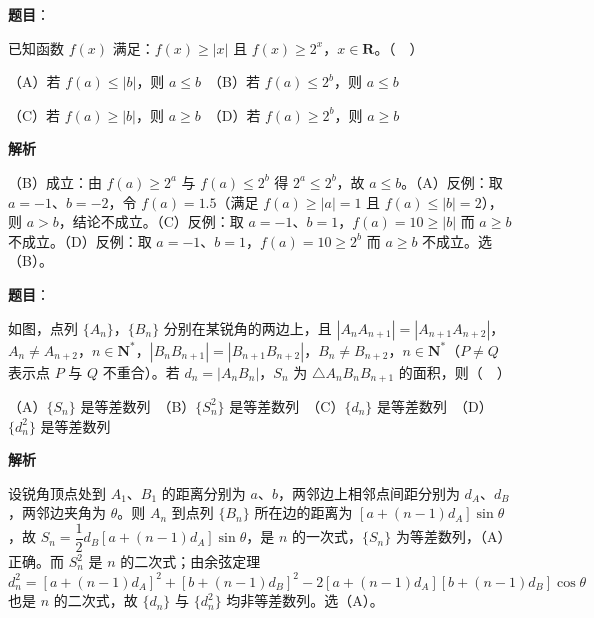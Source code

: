\begin{answer}

\textbf{题目}：

已知函数 \(f(x)\) 满足：\(f(x)\geqslant|x|\) 且 \(f(x)\geqslant2^{x}\)，\(x\in\mathbf{R}\)。（　）

（A）若 \(f(a)\leqslant|b|\)，则 \(a\leqslant b\)　（B）若 \(f(a)\leqslant2^{b}\)，则 \(a\leqslant b\)

（C）若 \(f(a)\geqslant|b|\)，则 \(a\geqslant b\)　（D）若 \(f(a)\geqslant2^{b}\)，则 \(a\geqslant b\)

\textbf{解析}

（B）成立：由 \(f(a)\geqslant2^{a}\) 与 \(f(a)\leqslant2^{b}\) 得 \(2^{a}\leqslant2^{b}\)，故 \(a\leqslant b\)。（A）反例：取 \(a=-1\)、\(b=-2\)，令 \(f(a)=1.5\)（满足 \(f(a)\geqslant|a|=1\) 且 \(f(a)\leqslant|b|=2\)），则 \(a>b\)，结论不成立。（C）反例：取 \(a=-1\)、\(b=1\)，\(f(a)=10\geqslant|b|\) 而 \(a\geqslant b\) 不成立。（D）反例：取 \(a=-1\)、\(b=1\)，\(f(a)=10\geqslant2^{b}\) 而 \(a\geqslant b\) 不成立。选（B）。


\end{answer}
\begin{answer}

\textbf{题目}：

如图，点列 \(\{A_{n}\}\)，\(\{B_{n}\}\) 分别在某锐角的两边上，且 \(|A_{n}A_{n+1}|=|A_{n+1}A_{n+2}|\)，\(A_{n}\neq A_{n+2}\)，\(n\in\mathbf{N}^{*}\)，\(|B_{n}B_{n+1}|=|B_{n+1}B_{n+2}|\)，\(B_{n}\neq B_{n+2}\)，\(n\in\mathbf{N}^{*}\)（\(P\neq Q\) 表示点 \(P\) 与 \(Q\) 不重合）。若 \(d_{n}=|A_{n}B_{n}|\)，\(S_{n}\) 为 \(\triangle A_{n}B_{n}B_{n+1}\) 的面积，则（　）
\nopagebreak[4]
\begin{center}\end{center}
\nopagebreak[4]
（A）\(\{S_{n}\}\) 是等差数列　（B）\(\{S_{n}^{2}\}\) 是等差数列　（C）\(\{d_{n}\}\) 是等差数列　（D）\(\{d_{n}^{2}\}\) 是等差数列

\textbf{解析}

设锐角顶点处到 \(A_{1}\)、\(B_{1}\) 的距离分别为 \(a\)、\(b\)，两邻边上相邻点间距分别为 \(d_{A}\)、\(d_{B}\)，两邻边夹角为 \(\theta\)。则 \(A_{n}\) 到点列 \(\{B_{n}\}\) 所在边的距离为 \([a+(n-1)d_{A}]\sin\theta\)，故 \(S_{n}=\dfrac{1}{2}d_{B}[a+(n-1)d_{A}]\sin\theta\)，是 \(n\) 的一次式，\(\{S_{n}\}\) 为等差数列，（A）正确。而 \(S_{n}^{2}\) 是 \(n\) 的二次式；由余弦定理 \(d_{n}^{2}=[a+(n-1)d_{A}]^{2}+[b+(n-1)d_{B}]^{2}-2[a+(n-1)d_{A}][b+(n-1)d_{B}]\cos\theta\) 也是 \(n\) 的二次式，故 \(\{d_{n}\}\) 与 \(\{d_{n}^{2}\}\) 均非等差数列。选（A）。


\end{answer}
